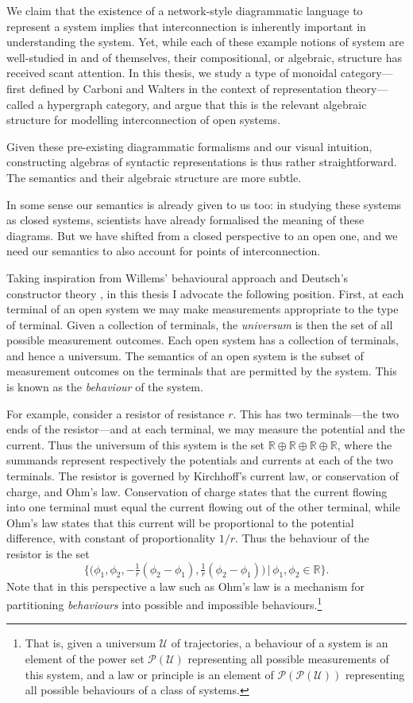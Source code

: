We claim that the existence of a network-style diagrammatic language to
represent a system implies that interconnection is inherently important in
understanding the system. Yet, while each of these example notions of system are
well-studied in and of themselves, their compositional, or algebraic, structure
has received scant attention. In this thesis, we study a type of monoidal
category---first defined by Carboni and Walters \cite{CW, Ca} in the context of
representation theory---called a hypergraph category, and argue that this is the
relevant algebraic structure for modelling interconnection of open systems. 

Given these pre-existing diagrammatic formalisms and our visual intuition,
constructing algebras of syntactic representations is thus rather
straightforward. The semantics and their algebraic structure are more subtle. 

In some sense our semantics is already given to us too: in studying these
systems as closed systems, scientists have already formalised the meaning of
these diagrams. But we have shifted from a closed perspective to an open one,
and we need our semantics to also account for points of interconnection.

Taking inspiration from Willems' behavioural approach \cite{Wi} and Deutsch's
constructor theory \cite{Deu}, in this thesis I advocate the following position.
First, at each terminal of an open system we may make measurements appropriate
to the type of terminal. Given a collection of terminals, the \emph{universum}
is then the set of all possible measurement outcomes. Each open system has a
collection of terminals, and hence a universum. The semantics of an open system
is the subset of measurement outcomes on the terminals that are permitted by the
system. This is known as the \emph{behaviour} of the system.

For example, consider a resistor of resistance $r$. This has two terminals---the
two ends of the resistor---and at each terminal, we may measure the potential
and the current. Thus the universum of this system is the set
$\mathbb{R}\oplus\mathbb{R}\oplus\mathbb{R}\oplus\mathbb{R}$, where the summands
represent respectively the potentials and currents at each of the two terminals.
The resistor is governed by Kirchhoff's current law, or conservation of charge,
and Ohm's law.  Conservation of charge states that the current flowing into one
terminal must equal the current flowing out of the other terminal, while Ohm's
law states that this current will be proportional to the potential difference,
with constant of proportionality $1/r$. Thus the behaviour of the resistor is
the set 
\[
  \big\{\big(\phi_1,\phi_2,
    -\tfrac1r(\phi_2-\phi_1),\tfrac1r(\phi_2-\phi_1)\big)\,\big\vert\,
    \phi_1,\phi_2 \in \mathbb{R}\big\}.
\]
Note that in this perspective a law such as Ohm's law is a mechanism for
partitioning \emph{behaviours} into possible and impossible
behaviours.\footnote{That is, given a universum $\mathcal U$ of trajectories, a
  behaviour of a system is an element of the power set $\mathcal P(\mathcal
U)$ representing all possible measurements of this system, and a law or principle
is an element of $\mathcal P(\mathcal P(\mathcal U))$ representing all possible
behaviours of a class of systems.}


